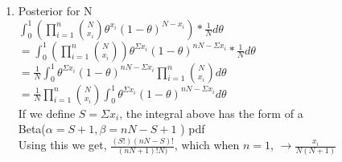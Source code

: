 \documentclass[paper=a4, fontsize=11pt]{scrartcl}
\newcommand{\parens}[1]{ \left( #1 \right) }
\begin{document}
\begin{enumerate}
\begin{enumerate}[1]
	\item Posterior for N\\
	$\int^1_0 \parens{\prod_{i=1}^n\binom{N}{x_i}\theta^{x_i}(1-\theta)^{N - x_i}}* \frac{1}{N} d\theta$\\
	$=\int^1_0 \parens{\prod_{i=1}^n\binom{N}{x_i}}\theta^{\Sigma x_i}(1-\theta)^{nN - \Sigma x_i}* \frac{1}{N} d\theta$\\
	$= \frac{1}{N} \int^1_0 \theta^{\Sigma x_i}(1-\theta)^{nN - \Sigma x_i}\prod_{i=1}^n\binom{N}{x_i} d\theta$\\
	$= \frac{1}{N} \prod_{i=1}^n\binom{N}{x_i}  \int^1_0 \theta^{\Sigma x_i}(1-\theta)^{nN - \Sigma x_i}d\theta$\\
	If we define $S = \Sigma x_i$, the integral above has the form of a\\ 
	Beta($\alpha=S+1, \beta=nN - S + 1$ ) pdf\\
	Using this we get, $\frac{(S!)(nN-S)!}{(nN + 1)!N)}$, which when $n=1$, $\rightarrow \frac{x_i}{N(N+1)}$

      
    \end{enumerate}
\end{enumerate}
\end{document}
